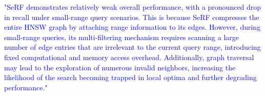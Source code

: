 \documentclass[sigconf, nonacm]{acmart}
\begin{document}
\textcolor{blue}{"SeRF demonstrates relatively weak overall performance, with a pronounced drop in recall under small-range query scenarios. This is because SeRF compresses the entire HNSW graph by attaching range information to its edges. However, during small-range queries, its multi-filtering mechanism requires scanning a large number of edge entries that are irrelevant to the current query range, introducing fixed computational and memory access overhead. Additionally, graph traversal may lead to the exploration of numerous invalid neighbors, increasing the likelihood of the search becoming trapped in local optima and further degrading performance."}



\balance
%
%
\end{document}

